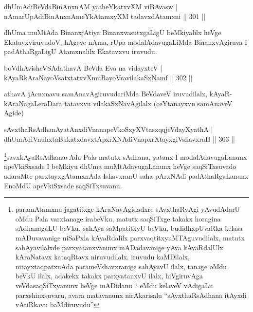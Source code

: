 
\begin{shl}
dhUmAdiBeVdaBinAnxnAM yatheYkatxvXM viBAvasw |
nAmarUpAdiBinAnxnAmeYkAtamxyXM tadavxdAtamxni \hfill || 301 ||
\end{shl}

\begin{artha}
dhUma muMtAda BinanxjAtiya BinanxvasutxgaLigU beMkiyalilx heVge Ekatavx\-viruvudoV, hAgeye nAma, rUpa modalAdavugaLiMda BinanxvAgiruva I padAthaRgaLigU Atamxnalilx Ekatavxvu iruvudu.
\end{artha}


	\begin{shl}
boVdhAvisheVSAdathavA BeVda Eva na vidayxteV |
kAyaRkAraNayoVsatxtatxvXmuBayoVravilakaSxNamf \hfill || 302 ||
\end{shl}

\begin{artha}
athavA jAcnxnavu samAnavAgiruvudariMda BeVdaveV iruvudilalx, kAyaR-\-kAraNagaLeraDara tatavxvu vilakaSxNavAgilalx (ceYtanayxvu samAnaveV Agide)
\end{artha}

\begin{shl}
sAvxthaRsAdhanAyatAnxdiVnanapeVkoSxyXVtasxqqjeVdayXyathA |
dhUmAdiVnuhxtaBukatxdavxtApxrXNAdiVnapxrXtayxgiVshavxraH \hfill || 303 ||
\end{shl}

\begin{artha}
\footnote[1]{paramAtamxnu jagatitxge kAraNavAgidadxre sAvxthaRvAgi yAvudAdarU oMdu Pala varxtanage irabeVku, matutx saqSiTxge takakx horagina sAdhanagaLU beVku. sahAya saMpatitxyU beVku, budidhxpUvaRka kelasa mADuvavanige niSaPxla kAyaRdalilx parxvaqtitxyuMTAguvudilalx, matutx sahAyavilalxde parxyatanxvanunx mADadavanige yAva kAyaRdalUlx kAraNatavx kataqRtavx niruvudilalx. iruvudu kaMDilalx, nitayxtaqpatxnAda parameVshavxranige sahAyavU ilalx, tanage oMdu beVkU ilalx, adakekx takakx parxyatanxvU ilalx, hiVgiruvAga veVdasaqSiTxyanunx heVge mADidanu ? eMdu kelaveV vAdigaLu parxshinxsuvaru, avara matavanunx nirAkarisalu ``sAvxthaRsAdhana itAyxdi vAtiRkavu baMdiruvudu''}savxkAyaRsAdhanavAda Pala matutx sAdhana, yatanx I modalAdavugaLanunx apeVkiSxsade I beMkiyu dhUma muMtAdavugaLanunx heVge saqSiTxsuvado adaraMte parxtayxgAtamxnAda IshavxranU saha pArxNAdi padAthaRgaLanunx EnoMdU apeVkiSxsade saqSiTxsuvanu.
\end{artha}

